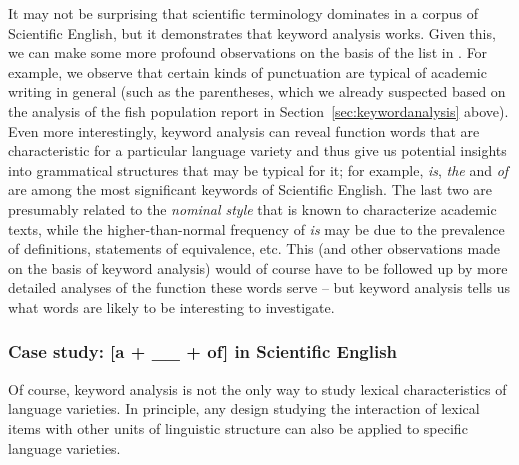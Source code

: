 It may not be surprising that scientific terminology dominates in a corpus of Scientific English, but it demonstrates that keyword  analysis works. Given this, we can make some more profound observations on the basis of the list in . For example, we observe that certain kinds of punctuation are typical of academic  writing in general (such as the parentheses, which we already suspected based on the analysis of the fish population report in Section~\ref{sec:keywordanalysis} above). Even more interestingly, keyword  analysis can reveal function words that are characteristic for a particular language variety  and thus give us potential insights into grammatical  structures that may be typical for it; for example, \textit{is}, \textit{the} and \textit{of} are among the most significant keywords of Scientific English. The last two are presumably related to the \textit{nominal  style}  that is known to characterize academic  texts, while the higher\hyp{}than\hyp{}normal frequency  of \textit{is} may be due to the prevalence of definitions, statements of equivalence, etc. This (and other observations made on the basis of keyword  analysis) would of course have to be followed up by more detailed analyses of the function these words serve -- but keyword analysis tells us what words are likely to be interesting to investigate.

\subsubsection{Case study: [a + \_\_ + of] in Scientific English}
\label{sec:anofinmedicalresearchpapers}

Of course, keyword  analysis is not the only way to study lexical characteristics of language varieties.  In principle, any design  studying the interaction of lexical items with other units of linguistic structure can also be applied to specific language varieties.

